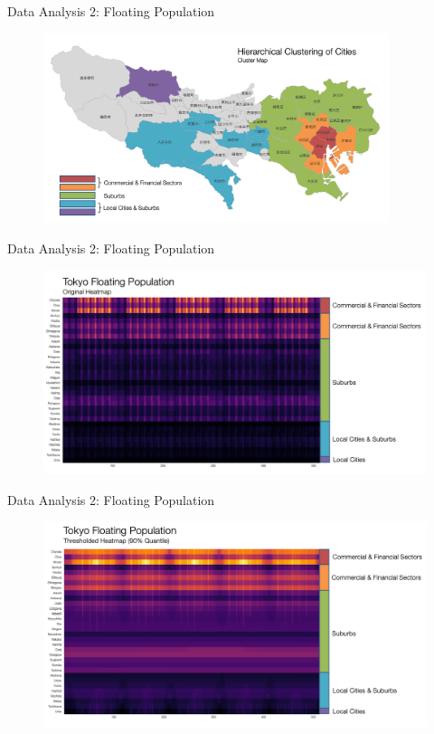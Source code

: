 \documentclass[aspectratio=169]{beamer}
\begin{document}
\begin{frame}{Data Analysis 2: Floating Population}
    \begin{figure}
        \centering
        \includegraphics[height=0.85\textheight,width=0.9\textwidth]{images/cluster_map.png}
    \end{figure}
\end{frame}

\begin{frame}{Data Analysis 2: Floating Population}
    \begin{figure}
        \centering
        \includegraphics[height=0.8\textheight, keepaspectratio]{images/original.png}
    \end{figure}
\end{frame}

\begin{frame}{Data Analysis 2: Floating Population}
    \begin{figure}
        \centering
        \includegraphics[height=0.8\textheight, keepaspectratio]{images/threshold90.png}
    \end{figure}
\end{frame}
\end{document}
